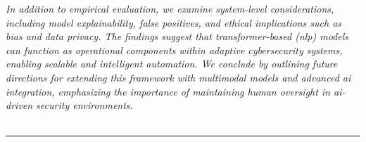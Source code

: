 \documentclass[12pt,oneside]{academia}
\theoremstyle{remark}
\begin{document}
\textit{In addition to empirical evaluation, we examine system-level considerations, including model explainability, false positives, and ethical implications such as bias and data privacy. The findings suggest that transformer-based (\acrshort{nlp}) models can function as operational components within adaptive cybersecurity systems, enabling scalable and intelligent automation. We conclude by outlining future directions for extending this framework with multimodal models and advanced \acrshort{ai} integration, emphasizing the importance of maintaining human oversight in \acrshort{ai}-driven security environments.}
\\
\noindent 
\parskip=8pt \\
\parskip=5pt
\noindent \rule{\textwidth}{1pt}
\let\thefootnote\relax
{} 
\columnseprule=0pt
\setlength{\columnsep}{1.5em}
\vspace{-12pt}
\end{document}

